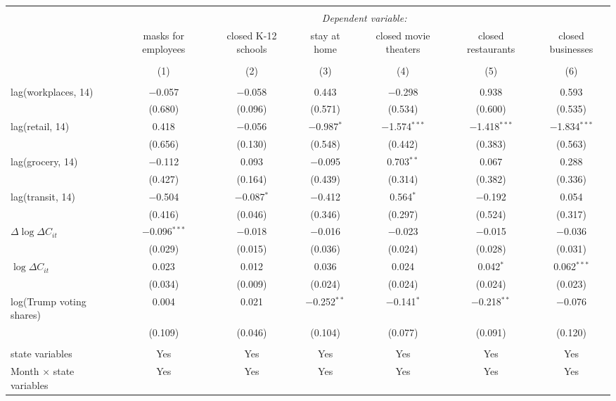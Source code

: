\begin{tabular}{@{\extracolsep{1pt}}lcccccc} 
\\[-1.8ex]\hline 
\hline \\[-1.8ex] 
 & \multicolumn{6}{c}{\textit{Dependent variable:}} \\ 
\cline{2-7} 
 & masks for employees & closed K-12 schools & stay at home & closed movie theaters & closed restaurants & closed businesses \\ 
\\[-1.8ex] & (1) & (2) & (3) & (4) & (5) & (6)\\ 
\hline \\[-1.8ex] 
 lag(workplaces, 14) & $-$0.057 & $-$0.058 & 0.443 & $-$0.298 & 0.938 & 0.593 \\ 
  & (0.680) & (0.096) & (0.571) & (0.534) & (0.600) & (0.535) \\ 
  lag(retail, 14) & 0.418 & $-$0.056 & $-$0.987$^{*}$ & $-$1.574$^{***}$ & $-$1.418$^{***}$ & $-$1.834$^{***}$ \\ 
  & (0.656) & (0.130) & (0.548) & (0.442) & (0.383) & (0.563) \\ 
  lag(grocery, 14) & $-$0.112 & 0.093 & $-$0.095 & 0.703$^{**}$ & 0.067 & 0.288 \\ 
  & (0.427) & (0.164) & (0.439) & (0.314) & (0.382) & (0.336) \\ 
  lag(transit, 14) & $-$0.504 & $-$0.087$^{*}$ & $-$0.412 & 0.564$^{*}$ & $-$0.192 & 0.054 \\ 
  & (0.416) & (0.046) & (0.346) & (0.297) & (0.524) & (0.317) \\ 
  $\Delta \log \Delta C_{it}$ & $-$0.096$^{***}$ & $-$0.018 & $-$0.016 & $-$0.023 & $-$0.015 & $-$0.036 \\ 
  & (0.029) & (0.015) & (0.036) & (0.024) & (0.028) & (0.031) \\ 
  $\log \Delta C_{it}$ & 0.023 & 0.012 & 0.036 & 0.024 & 0.042$^{*}$ & 0.062$^{***}$ \\ 
  & (0.034) & (0.009) & (0.024) & (0.024) & (0.024) & (0.023) \\ 
  log(Trump voting shares) & 0.004 & 0.021 & $-$0.252$^{**}$ & $-$0.141$^{*}$ & $-$0.218$^{**}$ & $-$0.076 \\ 
  & (0.109) & (0.046) & (0.104) & (0.077) & (0.091) & (0.120) \\ 
 \hline \\[-1.8ex] 
state variables & Yes & Yes & Yes & Yes & Yes & Yes \\ 
Month $\times$ state variables & Yes & Yes & Yes & Yes & Yes & Yes \\ 

\end{tabular}
